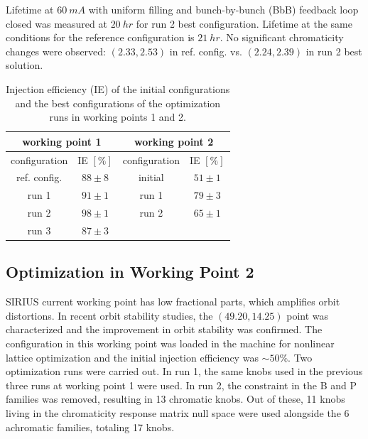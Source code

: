 \documentclass[a4paper,
               keeplastbox,   %
               ]{jacow}
\begin{document}
Lifetime at $60~\unit{mA}$ with uniform filling and bunch-by-bunch (BbB) feedback loop closed was measured at $20~\unit{hr}$ for run 2 best configuration. Lifetime at the same conditions for the reference configuration is $21~\unit{hr}$. No significant chromaticity changes were observed: $(2.33, 2.53)$ in ref. config. vs. $(2.24, 2.39)$ in run 2 best solution.  
\begin{table}[!h]
\centering
\caption{Injection efficiency (IE) of the initial configurations and the best configurations of the optimization runs in working points 1 and 2.} 
\begin{tabular}{cccc}
\toprule
\multicolumn{2}{c}{working point 1}         & \multicolumn{2}{c}{working point 2}                \\ \midrule
configuration & IE $[\%]$ & configuration        & IE $[\%]$ \\ \hline
ref. config.  & $88\pm8$                & initial              & $51\pm1$                \\
run 1         & $91\pm1$                & run 1                & $79\pm3$                \\
run 2         & $98\pm1$                & run 2                & $65\pm1    $                \\
run 3         & $87\pm3$                & \multicolumn{1}{l}{} & \multicolumn{1}{l}{}        \\ \hline
\end{tabular}

\label{table1}
\end{table}


\subsection{Optimization in Working Point 2}
 SIRIUS current working point has low fractional parts, which amplifies orbit distortions. In recent orbit stability studies, the $(49.20, 14.25)$ point was characterized and the improvement in orbit stability was confirmed. The configuration in this working point was loaded in the machine for nonlinear lattice optimization and the initial injection efficiency was $\sim50\%$. Two optimization runs were carried out. In run 1, the same knobs used in the previous three runs at working point 1 were used. In run 2, the constraint in the B and P families was removed, resulting in 13 chromatic knobs. Out of these, 11 knobs living in the chromaticity response matrix null space were used alongside the 6 achromatic families, totaling 17 knobs. 
 
\end{document}
